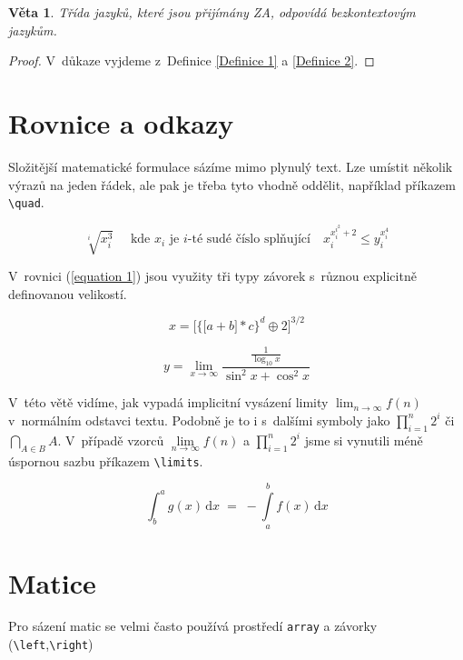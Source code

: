 \documentclass[11pt, twocolumn]{article}
\newtheorem{theorem}{Věta}
\begin{document}
\begin{theorem}
Třída jazyků, které jsou přijímány ZA, odpovídá
\emph{bezkontextovým jazykům.}
\end{theorem}
\begin{proof}
V~důkaze vyjdeme z~Definice \ref{Definice 1} a \ref{Definice 2}.
\end{proof}

\section{Rovnice a odkazy}

Složitější matematické formulace sázíme mimo plynulý
text. Lze umístit několik výrazů na jeden řádek, ale pak je
třeba tyto vhodně oddělit, například příkazem \verb|\quad|.

$$\sqrt[i]{x_i^3}\quad \text{ kde } x_i \text{ je } i\text{-té sudé číslo splňující}\quad x_i^{x_i^{i^2} + 2}\leq y_i^{x_i^4}$$

V~rovnici (\ref{equation 1}) jsou využity tři typy závorek s~různou
explicitně definovanou velikostí.

\begin{equation}\label{equation 1}
    x = \bigg[ \Big\{ \big[a + b\big] \ast c \Big\} ^d \oplus 2 \bigg] ^{3/2}
\end{equation}


    $$y = \lim\limits _{x \rightarrow \infty} \frac{\frac{1}{\log _{10} x}}{\sin ^2 x + \cos ^2 x}$$

V~této větě vidíme, jak vypadá implicitní vysázení li\-mity $\lim _{n \rightarrow \infty} f(n)$ v~normálním odstavci textu. Podobně
je to i s~dalšími symboly jako $\prod_{i = 1} ^n 2^i$ či $\bigcap _{A\in B} A$. V~pří\-padě vzorců $\lim\limits _{n \rightarrow \infty} f(n)$ a $\prod\limits_{i = 1} ^n 2^i$ jsme si vynutili méně úspornou sazbu příkazem \verb|\limits|. 

\begin{equation}
    \int _b ^a g(x)\, \mathrm{d}x \; =\; - \int\limits _a ^b f(x)\, \mathrm{d}x
\end{equation}

\section{Matice}
Pro sázení matic se velmi často používá prostředí \verb|array|
a závorky (\verb|\left|,\verb|\right|)
\end{document}
